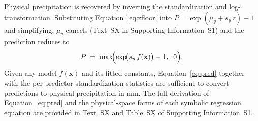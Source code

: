 Physical precipitation is recovered by inverting the standardization and
log-transformation. Substituting Equation~\ref{eq:zfloor} into $P =
\exp(\mu_y + s_y\,z) - 1$ and simplifying, $\mu_y$ cancels
(Text~SX in Supporting Information~S1) and the prediction reduces to
%
\begin{equation}
  P \;=\; \max\!\Bigl(\exp\!\bigl(s_y\,f(\mathbf{x})\bigr) - 1,\;\;0\Bigr).
  \label{eq:pred}
\end{equation}
%
Given any model $f(\mathbf{x})$ and its fitted constants,
Equation~\ref{eq:pred} together with the per-predictor standardization
statistics are sufficient to convert predictions to physical precipitation in
mm. The full derivation of Equation~\ref{eq:pred} and the physical-space forms
of each symbolic regression equation are provided in Text~SX and Table~SX of
Supporting Information~S1.
